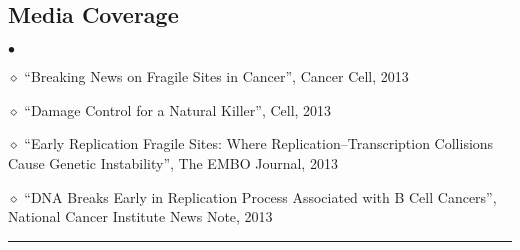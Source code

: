 \documentclass[12pt, centered, centered]{res_yy}
\newenvironment{list2}{
  \begin{list}{$\bullet$}{%
      \setlength{\itemsep}{0in}
      \setlength{\parsep}{0in} \setlength{\parskip}{0in}
      \setlength{\topsep}{0in} \setlength{\partopsep}{0in} 
      \setlength{\leftmargin}{0.2in}}}{\end{list}}
\begin{document}
\begin{resume}
\section{\sc Media Coverage} 
\vspace{.2in}
\begin{list2}
\item[$\diamond$] ``Breaking News on Fragile Sites in Cancer'', Cancer Cell, 2013
\item[$\diamond$] ``Damage Control for a Natural Killer'', Cell, 2013
\item[$\diamond$] ``Early Replication Fragile Sites: Where Replication--Transcription Collisions Cause Genetic Instability'', The EMBO Journal, 2013
\item[$\diamond$] ``DNA Breaks Early in Replication Process Associated with B Cell Cancers'', National Cancer Institute News Note, 2013
\end{list2}
\vspace{-.1in}
\rule{\linewidth}{0.05mm}


\end{resume}
\end{document}
